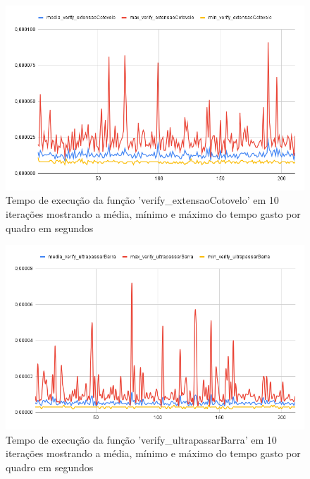\begin{figure}[H]
	\centering
	\caption{Tempo de execução da função 'verify\_extensaoCotovelo' em 10 iterações mostrando a média, mínimo e máximo do tempo gasto por quadro em segundos}
	\includegraphics[scale=0.45]{figuras/grafico/extensaoCotovelo.png}
\end{figure}


\begin{figure}[H]
	\centering
	\caption{Tempo de execução da função 'verify\_ultrapassarBarra' em 10 iterações mostrando a média, mínimo e máximo do tempo gasto por quadro em segundos}
	\includegraphics[scale=0.55]{figuras/grafico/ultrapassarBarra.png}
\end{figure}


